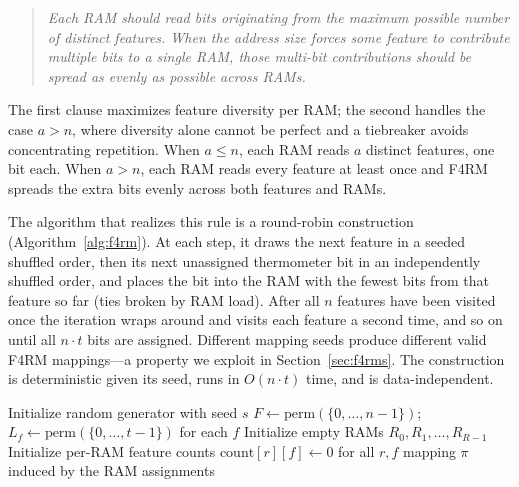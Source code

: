 \documentclass[runningheads]{llncs}
\begin{document}
\begin{quote}
\emph{Each RAM should read bits originating from the maximum possible number of distinct features. When the address size forces some feature to contribute multiple bits to a single RAM, those multi-bit contributions should be spread as evenly as possible across RAMs.}
\end{quote}

The first clause maximizes feature diversity per RAM; the second handles the case $a > n$, where diversity alone cannot be perfect and a tiebreaker avoids concentrating repetition. When $a \leq n$, each RAM reads $a$ distinct features, one bit each. When $a > n$, each RAM reads every feature at least once and F4RM spreads the extra bits evenly across both features and RAMs.

The algorithm that realizes this rule is a round-robin construction (Algorithm~\ref{alg:f4rm}). At each step, it draws the next feature in a seeded shuffled order, then its next unassigned thermometer bit in an independently shuffled order, and places the bit into the RAM with the fewest bits from that feature so far (ties broken by RAM load). After all $n$ features have been visited once the iteration wraps around and visits each feature a second time, and so on until all $n \cdot t$ bits are assigned. Different mapping seeds produce different valid F4RM mappings---a property we exploit in Section~\ref{sec:f4rms}. The construction is deterministic given its seed, runs in $O(n \cdot t)$ time, and is data-independent.

\begin{algorithm}[!tbp]
  \SetAlgoNoLine
  \BlankLine
  Initialize random generator with seed $s$\;
  $F \leftarrow \text{perm}(\{0,\ldots,n-1\})$; $L_f \leftarrow \text{perm}(\{0,\ldots,t-1\})$ for each $f$\;
  Initialize empty RAMs $R_0, R_1, \ldots, R_{R-1}$\;
  Initialize per-RAM feature counts $\text{count}[r][f] \leftarrow 0$ for all $r, f$\;
  \BlankLine
  \Return mapping $\pi$ induced by the RAM assignments\;
  \caption{F4RM mapping construction.}
  \label{alg:f4rm}
\end{algorithm}
\end{document}
